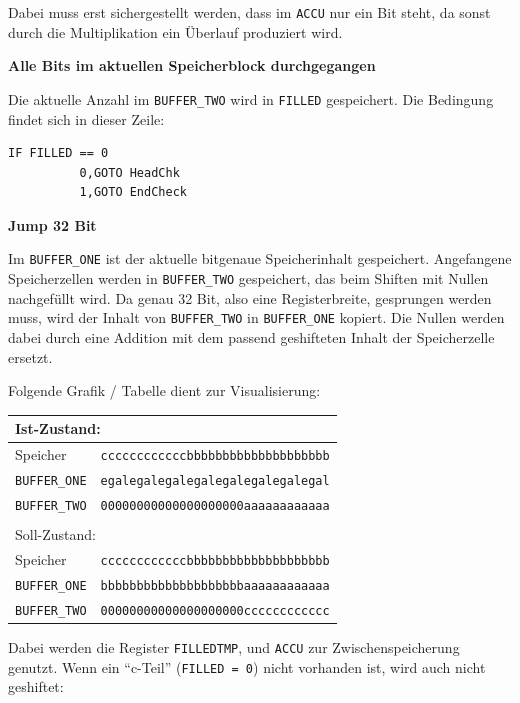 Dabei muss erst sichergestellt werden, dass im \texttt{ACCU} nur ein Bit steht, da sonst durch die Multiplikation ein Überlauf produziert wird.

\textbf{Alle Bits im aktuellen Speicherblock durchgegangen}

Die aktuelle Anzahl im \texttt{BUFFER\_TWO} wird in \texttt{FILLED} gespeichert. Die Bedingung findet sich in dieser Zeile:

\begin{verbatim}
IF FILLED == 0
          0,GOTO HeadChk
          1,GOTO EndCheck
\end{verbatim}

\textbf{Jump 32 Bit}

Im \texttt{BUFFER\_ONE} ist der aktuelle bitgenaue Speicherinhalt gespeichert. Angefangene Speicherzellen werden in \texttt{BUFFER\_TWO} gespeichert, das beim Shiften mit Nullen nachgefüllt wird. Da genau 32 Bit, also eine Registerbreite, gesprungen werden muss, wird der Inhalt von \texttt{BUFFER\_TWO} in \texttt{BUFFER\_ONE} kopiert. Die Nullen werden dabei durch eine Addition mit dem passend geshifteten Inhalt der Speicherzelle ersetzt.

Folgende Grafik / Tabelle dient zur Visualisierung:

\begin{tabular}{|l|l|}
\multicolumn{2}{l}{Ist-Zustand:}\\
\hline
Speicher   & \texttt{ccccccccccccbbbbbbbbbbbbbbbbbbbb}\\
\hline
\texttt{BUFFER\_ONE} & \texttt{egalegalegalegalegalegalegalegal}\\
\hline
\texttt{BUFFER\_TWO} & \texttt{00000000000000000000aaaaaaaaaaaa}\\
\hline
\multicolumn{2}{l}{}\\
\multicolumn{2}{l}{Soll-Zustand:}\\
\hline
Speicher   & \texttt{ccccccccccccbbbbbbbbbbbbbbbbbbbb}\\
\hline
\texttt{BUFFER\_ONE} & \texttt{bbbbbbbbbbbbbbbbbbbbaaaaaaaaaaaa}\\
\hline
\texttt{BUFFER\_TWO} & \texttt{00000000000000000000cccccccccccc}\\
\hline
\end{tabular}

Dabei werden die Register \texttt{FILLEDTMP}, und \texttt{ACCU} zur Zwischenspeicherung genutzt. Wenn ein "`c-Teil"' (\texttt{FILLED = 0}) nicht vorhanden ist, wird auch nicht geshiftet:


